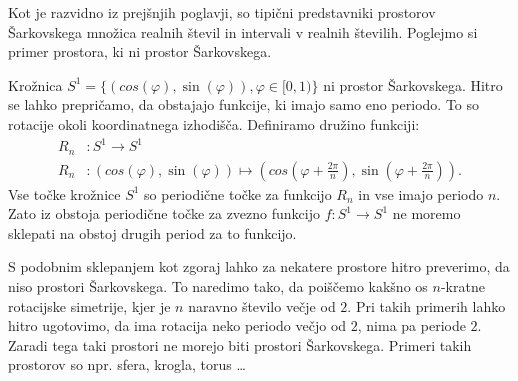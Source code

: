 \documentclass[mat2]{fmfdelo}
\begin{document}
Kot je razvidno iz prejšnjih poglavji, so tipični predstavniki prostorov Šarkovskega množica realnih števil in intervali v realnih številih. Poglejmo si primer prostora, ki ni prostor Šarkovskega.

\begin{primer}
Krožnica $S^1 = \{ (cos(\varphi), \sin(\varphi)), \varphi \in [0, 1) \}$ ni prostor Šarkovskega. Hitro se lahko prepričamo, da obstajajo funkcije, ki imajo samo eno periodo. To so rotacije okoli koordinatnega izhodišča. Definiramo družino funkciji: 
\begin{equation*} %
\begin{split}
R_n &: S^1 \to S^1 \\ 
R_n &: (cos(\varphi), \sin(\varphi)) \mapsto (cos(\varphi + \frac{2 \pi}{n}), \sin(\varphi + \frac{2 \pi}{n})).
\end{split}
\end{equation*}
Vse točke krožnice $S^1$ so periodične točke za funkcijo $R_n$ in vse imajo periodo $n$. Zato iz obstoja periodične točke za zvezno funkcijo $f : S^1 \to S^1$ ne moremo sklepati na obstoj drugih period za to funkcijo.
\end{primer}
S podobnim sklepanjem kot zgoraj lahko za nekatere prostore hitro preverimo, da niso prostori Šarkovskega. To naredimo tako, da poiščemo kakšno os $n$-kratne rotacijske simetrije, kjer je $n$ naravno število večje od $2$. Pri takih primerih lahko hitro ugotovimo, da ima rotacija neko periodo večjo od $2$, nima pa periode $2$. Zaradi tega taki prostori ne morejo biti prostori Šarkovskega. Primeri takih prostorov so npr. sfera, krogla, torus \dots 
\end{document}
